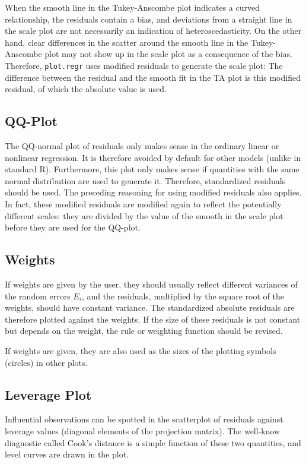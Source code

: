 \documentclass[11pt]{article}
\providecommand{\T}{\texttt}
\begin{document}
When the smooth line in the Tukey-Anscombe plot indicates a curved
relationship, the residuals contain a bias, and deviations from a straight
line in the scale plot are not necessarily an indication of
heteroscedasticity. On the other hand, clear differences in the scatter
around the smooth line in the Tukey-Anscombe plot may not show up in 
the scale plot as a consequence of the bias.
Therefore, \T{plot.regr} uses modified residuals to generate the scale
plot: The difference between the residual and the smooth fit in the
TA plot is this modified residual, of which the absolute value is used.

\subsection{QQ-Plot}
The QQ-normal plot of residuals only makes sense in the ordinary linear or
nonlinear regression. It is therefore avoided by default for other models 
(unlike in standard R).
Furthermore, this plot only makes sense if quantities with the same normal
distribution are used to generate it. 
Therefore, standardized residuals should be used.
The preceding reasoning for using modified residuals also applies.
In fact, these modified residuals are modified again to reflect the
potentially different scales: they are divided by the value of the smooth
in the scale plot before they are used for the QQ-plot.

\subsection{Weights}
If weights are given by the user, they should usually reflect different
variances of the random errors $E_i$, and the residuals, multiplied by the
square root of the weights, should have constant variance.
The standardized absolute residuals are therefore plotted against the weights.
If the size of these residuals is not constant but depends on the weight, 
the rule or weighting function should be revised.

If weights are given, they are also used as the sizes of the plotting
symbols (circles) in other plots.

\subsection{Leverage Plot}
Influential observations can be spotted in the scatterplot of residuals
against leverage values (diagonal elements of the projection matrix).
The well-know diagnostic called Cook's distance is a simple function of
these two quantities, and level curves are drawn in the plot.
\end{document}

